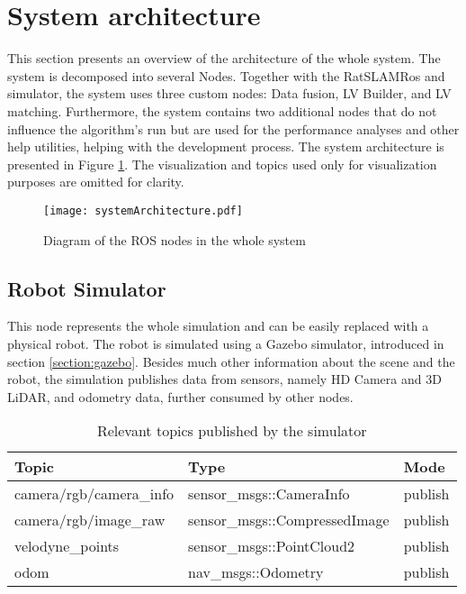 \section{System architecture}\label{section:systemArchitecture}

This section presents an overview of the architecture of the whole system. The system is decomposed into several Nodes. Together with the  RatSLAMRos and simulator, the system uses three custom nodes: Data fusion, LV Builder, and LV matching. Furthermore, the system contains two additional nodes that do not influence the algorithm's run but are used for the performance analyses and other help utilities, helping with the development process. The system architecture is presented in Figure \ref{fig:systemArchitecture}. The visualization and topics used only for visualization purposes are omitted for clarity.

\begin{figure}[htpb]
    \centering
    \texttt{[image: systemArchitecture.pdf]}
    \caption{Diagram of the ROS nodes in the whole system} \label{fig:systemArchitecture}
\end{figure}

\subsection{Robot Simulator}

This node represents the whole simulation and can be easily replaced with a physical robot. The robot is simulated using a Gazebo simulator, introduced in section \ref{section:gazebo}. Besides much other information about the scene and the robot, the simulation publishes data from sensors, namely HD Camera and 3D LiDAR, and odometry data, further consumed by other nodes.

\begin{table}[htpb]
    \caption{Relevant topics published by the simulator}\label{tab:robotSimulatorTopics}
    \centering
    \begin{tabular}{l l l}
        \toprule
        Topic                   & Type                          & Mode    \\
        \midrule
        camera/rgb/camera\_info & sensor\_msgs::CameraInfo      & publish \\
        camera/rgb/image\_raw   & sensor\_msgs::CompressedImage & publish \\
        velodyne\_points        & sensor\_msgs::PointCloud2     & publish \\
        odom                    & nav\_msgs::Odometry           & publish \\
        \bottomrule
    \end{tabular}
\end{table}

